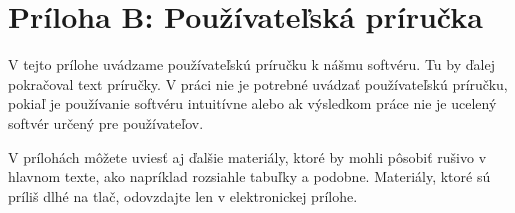 \chapter*{Príloha B: Používateľská príručka}

V tejto prílohe uvádzame používateľskú príručku k nášmu softvéru. Tu
by ďalej pokračoval text príručky. V práci nie je potrebné uvádzať
používateľskú príručku, pokiaľ je používanie softvéru intuitívne
alebo ak výsledkom práce nie je ucelený softvér určený pre
používateľov.

V prílohách môžete uviesť aj ďalšie materiály, ktoré by mohli pôsobiť
rušivo v hlavnom texte, ako napríklad rozsiahle tabuľky a
podobne. Materiály, ktoré sú príliš dlhé na tlač, odovzdajte
len v elektronickej prílohe.
